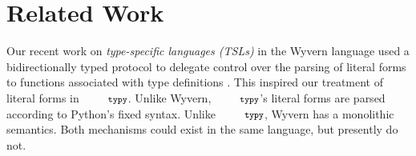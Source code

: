 \documentclass[10pt]{sigplanconf}
\newcommand{\typy}{\texttt{\footnotesize typy}}
\begin{document}
\section{Related Work}\label{related}\label{sec:related-work}

%




Our recent work on \emph{type-specific languages (TSLs)} in the Wyvern language used a bidirectionally typed protocol to delegate control over the parsing of literal forms to functions associated with type definitions \cite{TSLs}. This inspired our treatment of literal forms in $\typy$. Unlike Wyvern, $\typy$'s literal forms are parsed according to Python's fixed syntax. Unlike $\typy$, Wyvern has a monolithic semantics. Both mechanisms could exist in the same language, but presently do not. %



\end{document}
